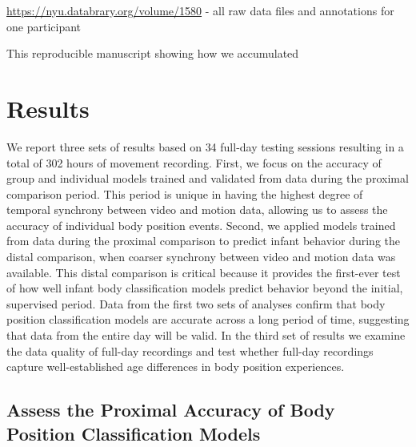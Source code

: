 \documentclass[
  man]{apa6}
\begin{document}
\url{https://nyu.databrary.org/volume/1580} - all raw data files and annotations for one participant

This reproducible manuscript showing how we accumulated

\hypertarget{results}{%
\section{Results}\label{results}}

We report three sets of results based on 34 full-day testing sessions resulting in a total of 302 hours of movement recording. First, we focus on the accuracy of group and individual models trained and validated from data during the proximal comparison period. This period is unique in having the highest degree of temporal synchrony between video and motion data, allowing us to assess the accuracy of individual body position events. Second, we applied models trained from data during the proximal comparison to predict infant behavior during the distal comparison, when coarser synchrony between video and motion data was available. This distal comparison is critical because it provides the first-ever test of how well infant body classification models predict behavior beyond the initial, supervised period. Data from the first two sets of analyses confirm that body position classification models are accurate across a long period of time, suggesting that data from the entire day will be valid. In the third set of results we examine the data quality of full-day recordings and test whether full-day recordings capture well-established age differences in body position experiences.

\hypertarget{assess-the-proximal-accuracy-of-body-position-classification-models}{%
\subsection{Assess the Proximal Accuracy of Body Position Classification Models}\label{assess-the-proximal-accuracy-of-body-position-classification-models}}
\end{document}
